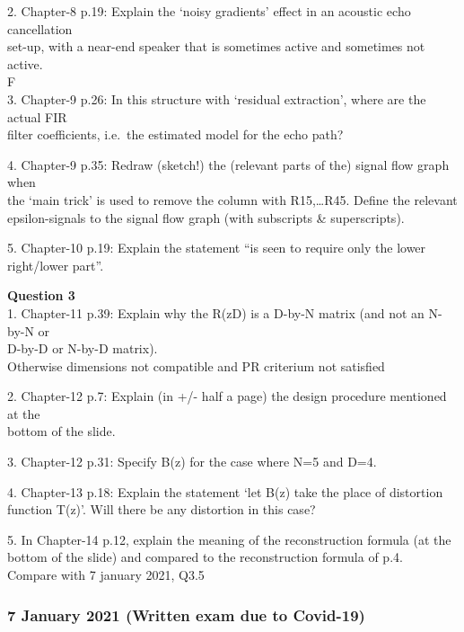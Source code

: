 \documentclass[
  a4paper,
  ,captions=tableheading
]{scrartcl}
\begin{document}
2. Chapter-8 p.19: Explain the `noisy gradients' effect in an acoustic
echo cancellation\\
set-up, with a near-end speaker that is sometimes active and sometimes
not active.\\
F\\
3. Chapter-9 p.26: In this structure with `residual extraction', where
are the actual FIR\\
filter coefficients, i.e.~the estimated model for the echo path?

4. Chapter-9 p.35: Redraw (sketch!) the (relevant parts of the) signal
flow graph when\\
the `main trick' is used to remove the column with R15,\ldots R45.
Define the relevant\\
epsilon-signals to the signal flow graph (with subscripts \&
superscripts).

5. Chapter-10 p.19: Explain the statement ``is seen to require only the
lower right/lower part''.

\textbf{Question 3}\\
1. Chapter-11 p.39: Explain why the R(zD) is a D-by-N matrix (and not an
N-by-N or\\
D-by-D or N-by-D matrix).\\
Otherwise dimensions not compatible and PR criterium not satisfied

2. Chapter-12 p.7: Explain (in +/- half a page) the design procedure
mentioned at the\\
bottom of the slide.

3. Chapter-12 p.31: Specify B(z) for the case where N=5 and D=4.

4. Chapter-13 p.18: Explain the statement `let B(z) take the place of
distortion\\
function T(z)'. Will there be any distortion in this case?

5. In Chapter-14 p.12, explain the meaning of the reconstruction formula
(at the\\
bottom of the slide) and compared to the reconstruction formula of
p.4.\\
Compare with 7 january 2021, Q3.5

\subsubsection{}\label{section-1}

\subsubsection{\texorpdfstring{\textbf{7 January 2021} (Written exam due
to
Covid-19)}{7 January 2021 (Written exam due to Covid-19)}}\label{january-2021-written-exam-due-to-covid-19}
\end{document}
